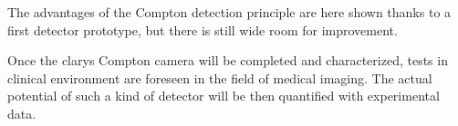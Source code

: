 The advantages of the Compton detection principle are here shown thanks to a first detector prototype, but there is still wide room for improvement.       

Once the \gls{clarys} Compton camera will be completed and characterized, tests in clinical environment are foreseen in the field of medical imaging. The actual potential of such a kind of detector will be then quantified with experimental data.

\clearpage
